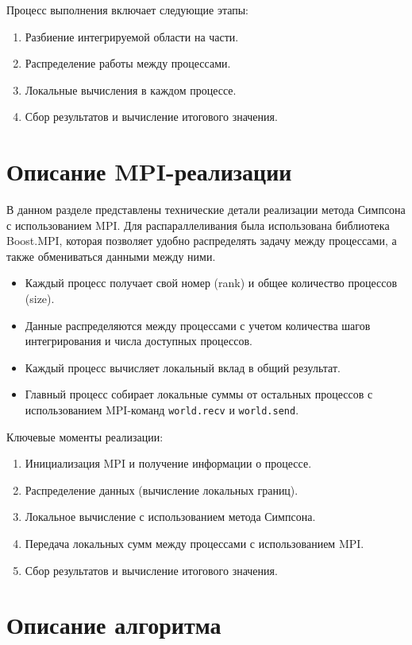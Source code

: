\documentclass[12pt,a4paper]{article}
\begin{document}
Процесс выполнения включает следующие этапы:
\begin{enumerate}
    \item Разбиение интегрируемой области на части.
    \item Распределение работы между процессами.
    \item Локальные вычисления в каждом процессе.
    \item Сбор результатов и вычисление итогового значения.
\end{enumerate}

\section*{Описание MPI-реализации}

В данном разделе представлены технические детали реализации метода Симпсона с использованием MPI. Для распараллеливания была использована библиотека Boost.MPI, которая позволяет удобно распределять задачу между процессами, а также обмениваться данными между ними.

\begin{itemize}
    \item Каждый процесс получает свой номер (rank) и общее количество процессов (size).
    \item Данные распределяются между процессами с учетом количества шагов интегрирования и числа доступных процессов.
    \item Каждый процесс вычисляет локальный вклад в общий результат.
    \item Главный процесс собирает локальные суммы от остальных процессов с использованием MPI-команд \texttt{world.recv} и \texttt{world.send}.
\end{itemize}

Ключевые моменты реализации:
\begin{enumerate}
    \item Инициализация MPI и получение информации о процессе.
    \item Распределение данных (вычисление локальных границ).
    \item Локальное вычисление с использованием метода Симпсона.
    \item Передача локальных сумм между процессами с использованием MPI.
    \item Сбор результатов и вычисление итогового значения.
\end{enumerate}

\section*{Описание алгоритма}
\end{document}
